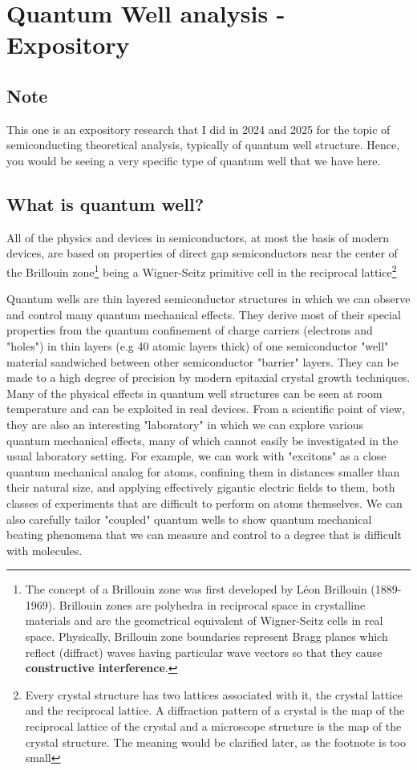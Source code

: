 \chapter{Quantum Well analysis - Expository}
\section{Note}
This one is an expository research that I did in 2024 and 2025 for the topic of semiconducting theoretical analysis, typically of quantum well structure. Hence, you would be seeing a very specific type of quantum well that we have here. 

\section{What is quantum well?}

All of the physics and devices in semiconductors, at most the basis of modern devices, are based on properties of direct gap semiconductors near the center of the Brillouin zone\footnote{The concept of a Brillouin zone was first developed by Léon Brillouin (1889-1969). Brillouin zones are polyhedra in reciprocal space in crystalline materials and are the geometrical equivalent of Wigner-Seitz cells in real space. Physically, Brillouin zone boundaries represent Bragg planes which reflect (diffract) waves having particular wave vectors so that they cause \textbf{constructive interference}.} being a Wigner-Seitz primitive cell in the reciprocal lattice\footnote{Every crystal structure has two lattices associated with it, the crystal lattice and the reciprocal lattice. A diffraction pattern of a crystal is the map of the reciprocal lattice of the crystal and a microscope structure is the map of the crystal structure. The meaning would be clarified later, as the footnote is too small}

Quantum wells are thin layered semiconductor structures in which we can observe and control many quantum mechanical effects. They derive most of their special properties from the quantum confinement of charge carriers (electrons and "holes") in thin layers (e.g 40 atomic layers thick) of one semiconductor "well" material sandwiched between other semiconductor "barrier" layers. They can be made to a high degree of precision by modern epitaxial crystal growth techniques. Many of the physical effects in quantum well structures can be seen at room temperature and can be exploited in real devices. From a scientific point of view, they are also an interesting "laboratory" in which we can explore various quantum mechanical effects, many of which cannot easily be investigated in the usual laboratory setting. For example, we can work with "excitons" as a close quantum mechanical analog for atoms, confining them in distances smaller than their natural size, and applying effectively gigantic electric fields to them, both classes of experiments that are difficult to perform on atoms themselves. We can also carefully tailor "coupled" quantum wells to show quantum mechanical beating phenomena that we can measure and control to a degree that is difficult with molecules.

